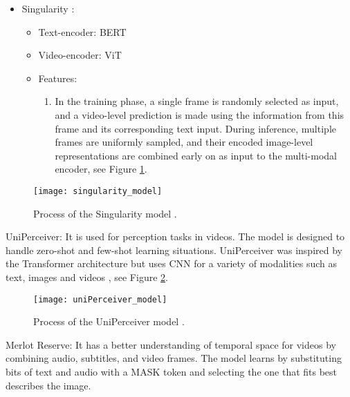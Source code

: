 \begin{itemize}
\item Singularity \cite{jei2022}:
\begin{itemize}
\item Text-encoder: BERT
\item Video-encoder: ViT
\item Features:
\begin{enumerate}
\item In the training phase, a single frame is randomly selected as input, and a video-level prediction is made using the information from this frame and its corresponding text input. During inference, multiple frames are uniformly sampled, and their encoded image-level representations are combined early on as input to the multi-modal encoder, see Figure \ref{fig:singularity_m}.
\end{enumerate}
\end{itemize}
\end{itemize}

\begin{figure}[h]
    \centering
    \texttt{[image: singularity\_model]}
    \caption{Process of the Singularity model \cite[Figure 1]{jei2022}.}
    \label{fig:singularity_m}
\end{figure}

UniPerceiver: It is used for perception tasks in videos. The model is designed to handle zero-shot and few-shot learning situations. UniPerceiver was inspired by the Transformer architecture but uses CNN for a variety of modalities such as text, images and videos \cite{zhu2022pretraining}, see Figure \ref{fig:uniPerceiver_m}.

\begin{figure}[h]
    \centering
    \texttt{[image: uniPerceiver\_model]}
    \caption{Process of the UniPerceiver model \cite[Figure 1]{zhu2022pretraining}.}
    \label{fig:uniPerceiver_m}
\end{figure}

Merlot Reserve: It has a better understanding of temporal space for videos by combining audio, subtitles, and video frames. The model learns by substituting bits of text and audio with a MASK token and selecting the one that fits best describes the image. 


